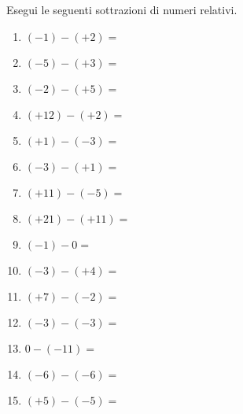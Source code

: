 \begin{esercizio}
Esegui le seguenti sottrazioni di numeri relativi.
\label{ese:2.9}
\begin{multicols}{3}
\begin{enumerate}[noitemsep, label=(\alph*)]
 \item \((-1)-(+2) =~\)
 \item \((-5)-(+3) =~\)
 \item \((-2)-(+5) =~\)
 \item \((+12)-(+2) =\)
 \item \((+1)-(-3) =\)
 \item \((-3)-(+1) =\)
 \item \((+11)-(-5) =\)
 \item \((+21)-(+11) =\)
 \item \((-1)-0 =\)
 \item \((-3)-(+4) =\)
 \item \((+7)-(-2) =\)
 \item \((-3)-(-3) =\)
 \item \(0-(-11) =\)
 \item \((-6)-(-6) =\)
 \item \((+5)-(-5) =\)
\end{enumerate}
\end{multicols}
\end{esercizio}


